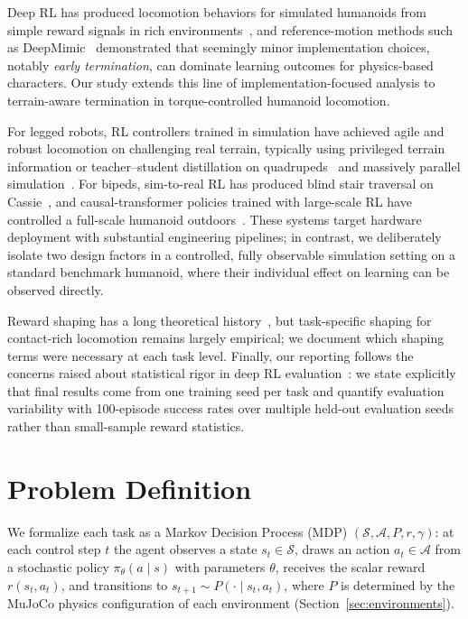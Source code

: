 \documentclass[conference,a4paper]{IEEEtran}
\begin{document}
Deep RL has produced locomotion behaviors for simulated humanoids from simple reward signals in rich environments~\cite{heess2017emergence}, and reference-motion methods such as DeepMimic~\cite{peng2018deepmimic} demonstrated that seemingly minor implementation choices, notably \emph{early termination}, can dominate learning outcomes for physics-based characters. Our study extends this line of implementation-focused analysis to terrain-aware termination in torque-controlled humanoid locomotion.

For legged robots, RL controllers trained in simulation have achieved agile and robust locomotion on challenging real terrain, typically using privileged terrain information or teacher--student distillation on quadrupeds~\cite{hwangbo2019agile,lee2020learning,miki2022wild} and massively parallel simulation~\cite{rudin2022minutes,makoviychuk2021isaac}. For bipeds, sim-to-real RL has produced blind stair traversal on Cassie~\cite{siekmann2021stairs}, and causal-transformer policies trained with large-scale RL have controlled a full-scale humanoid outdoors~\cite{radosavovic2024humanoid}. These systems target hardware deployment with substantial engineering pipelines; in contrast, we deliberately isolate two design factors in a controlled, fully observable simulation setting on a standard benchmark humanoid, where their individual effect on learning can be observed directly.

Reward shaping has a long theoretical history~\cite{ng1999shaping}, but task-specific shaping for contact-rich locomotion remains largely empirical; we document which shaping terms were necessary at each task level. Finally, our reporting follows the concerns raised about statistical rigor in deep RL evaluation~\cite{henderson2018matters,agarwal2021precipice}: we state explicitly that final results come from one training seed per task and quantify evaluation variability with 100-episode success rates over multiple held-out evaluation seeds rather than small-sample reward statistics.

\section{Problem Definition}
\label{sec:mdp}

We formalize each task as a Markov Decision Process (MDP) $(\mathcal{S}, \mathcal{A}, P, r, \gamma)$: at each control step $t$ the agent observes a state $s_t \in \mathcal{S}$, draws an action $a_t \in \mathcal{A}$ from a stochastic policy $\pi_\theta(a \mid s)$ with parameters $\theta$, receives the scalar reward $r(s_t, a_t)$, and transitions to $s_{t+1} \sim P(\cdot \mid s_t, a_t)$, where $P$ is determined by the MuJoCo physics configuration of each environment (Section~\ref{sec:environments}).
\end{document}
